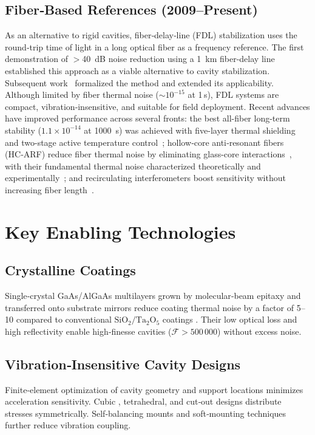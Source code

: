 \documentclass[12pt,a4paper]{article}
\begin{document}
\subsection{Fiber‑Based References (2009–Present)}
As an alternative to rigid cavities, fiber‑delay‑line (FDL) stabilization uses the round‑trip time of light in a long optical fiber as a frequency reference. The first demonstration of $>$40~dB noise reduction using a 1~km fiber-delay line~\cite{kefelian2009} established this approach as a viable alternative to cavity stabilization. Subsequent work~\cite{jiang2010} formalized the method and extended its applicability. Although limited by fiber thermal noise (${\sim}10^{-15}$ at 1 s), FDL systems are compact, vibration‑insensitive, and suitable for field deployment. Recent advances have improved performance across several fronts: the best all-fiber long-term stability ($1.1\times10^{-14}$ at 1000~s) was achieved with five-layer thermal shielding and two-stage active temperature control~\cite{huang2023}; hollow‑core anti‑resonant fibers (HC‑ARF) reduce fiber thermal noise by eliminating glass-core interactions~\cite{belardi2015}, with their fundamental thermal noise characterized theoretically and experimentally~\cite{michaudbelleau2022}; and recirculating interferometers boost sensitivity without increasing fiber length~\cite{gao2025}.

\section{Key Enabling Technologies}\label{sec:technologies}
\subsection{Crystalline Coatings}
Single‑crystal GaAs/AlGaAs multilayers grown by molecular‑beam epitaxy and transferred onto substrate mirrors reduce coating thermal noise by a factor of 5–10 compared to conventional $\mathrm{SiO_2/Ta_2O_5}$ coatings \cite{cole2013,steinlechner2018}. Their low optical loss and high reflectivity enable high‑finesse cavities ($\mathcal{F} > 500\,000$) without excess noise.

\subsection{Vibration‑Insensitive Cavity Designs}
Finite‑element optimization of cavity geometry and support locations minimizes acceleration sensitivity. Cubic \cite{webster2011}, tetrahedral, and cut‑out designs distribute stresses symmetrically. Self‑balancing mounts \cite{hafner2015} and soft‑mounting techniques \cite{herbers2022} further reduce vibration coupling.
\end{document}
